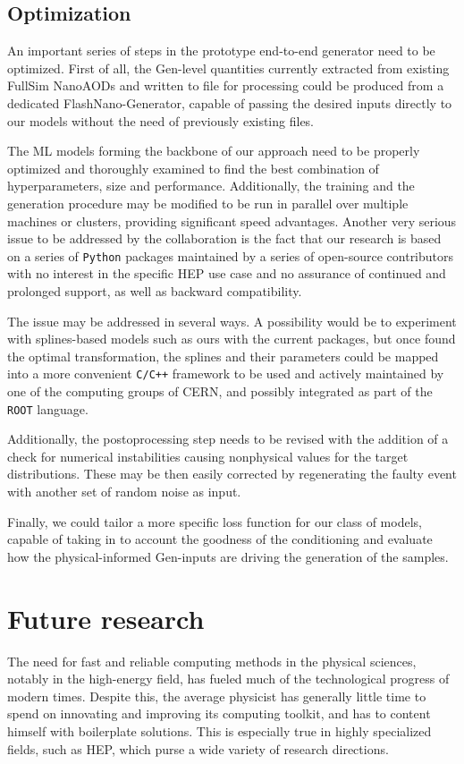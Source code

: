 \subsection{Optimization}
An important series of steps in the prototype end-to-end generator need to be optimized. 
First of all, the Gen-level quantities currently extracted from existing FullSim NanoAODs and written to file for processing could be produced from a dedicated FlashNano-Generator, capable of passing the desired inputs directly to our models without the need of previously existing files.

The ML models forming the backbone of our approach need to be properly optimized and thoroughly examined to find the best combination of hyperparameters, size and performance. Additionally, the training and the generation procedure may be modified to be run in parallel over multiple machines or clusters, providing significant speed advantages. Another very serious issue to be addressed by the collaboration is the fact that our research is based on a series of \texttt{Python} packages maintained by a series of open-source contributors with no interest in the specific HEP use case and no assurance of continued and prolonged support, as well as backward compatibility.

The issue may be addressed in several ways. A possibility would be to experiment with splines-based models such as ours with the current packages, but once found the optimal transformation, the splines and their parameters could be mapped into a more convenient \texttt{C/C++} framework to be used and actively maintained by one of the computing groups of CERN, and possibly integrated as part of the \texttt{ROOT} language.

Additionally, the postoprocessing step needs to be revised with the addition of a check for numerical instabilities causing nonphysical values for the target distributions. These may be then easily corrected by regenerating the faulty event with another set of random noise as input.

Finally, we could tailor a more specific loss function for our class of models, capable of taking in to account the goodness of the conditioning and evaluate how the physical-informed Gen-inputs are driving the generation of the samples.

\section{Future research}
The need for fast and reliable computing methods in the physical sciences, notably in the high-energy field, has fueled much of the technological progress of modern times. Despite this, the average physicist has generally little time to spend on innovating and improving its computing toolkit, and has to content himself with boilerplate solutions. This is especially true in highly specialized fields, such as HEP, which purse a wide variety of research directions.


